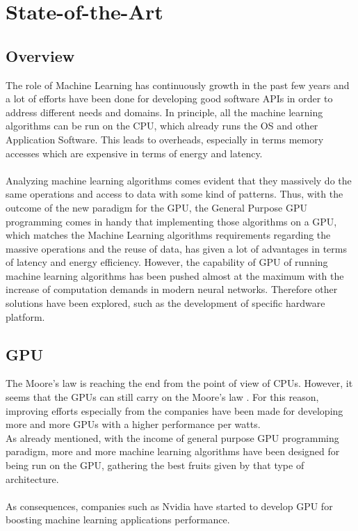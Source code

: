 \chapter{State-of-the-Art}
\section{Overview}
The role of Machine Learning has continuously growth in the past few years and a lot of efforts have been done for developing good software APIs in order to address different needs and domains. \newline In principle, all the machine learning algorithms can be run on the CPU, which already runs the OS and other Application Software. This leads to overheads, especially in terms memory accesses which are expensive in terms of energy and latency. \\\\
Analyzing machine learning algorithms comes evident that they massively do the same operations and access to data with some kind of patterns. Thus, with the outcome of the new paradigm for the GPU, the General Purpose GPU programming comes in handy that implementing those algorithms on a GPU, which matches the Machine Learning algorithms requirements regarding the massive operations and the reuse of data, has given a lot of advantages in terms of latency and energy efficiency. However, the capability of GPU of running machine learning algorithms has been pushed almost at the maximum with the increase of computation demands in modern neural networks. Therefore other solutions have been explored, such as the development of specific hardware platform.

\section{GPU}
The Moore's law is reaching the end from the point of view of CPUs. However, it seems that the GPUs can still carry on the Moore's law \cite{5496638}.\newline
For this reason, improving efforts especially from the companies have been made for developing more and more GPUs with a higher performance per watts.\\
As already mentioned, with the income of general purpose GPU programming paradigm, more and more machine learning algorithms have been designed for being run on the GPU, gathering the best fruits given by that type of architecture.\\\\
As consequences, companies such as Nvidia have started to develop GPU for boosting machine learning applications performance.
